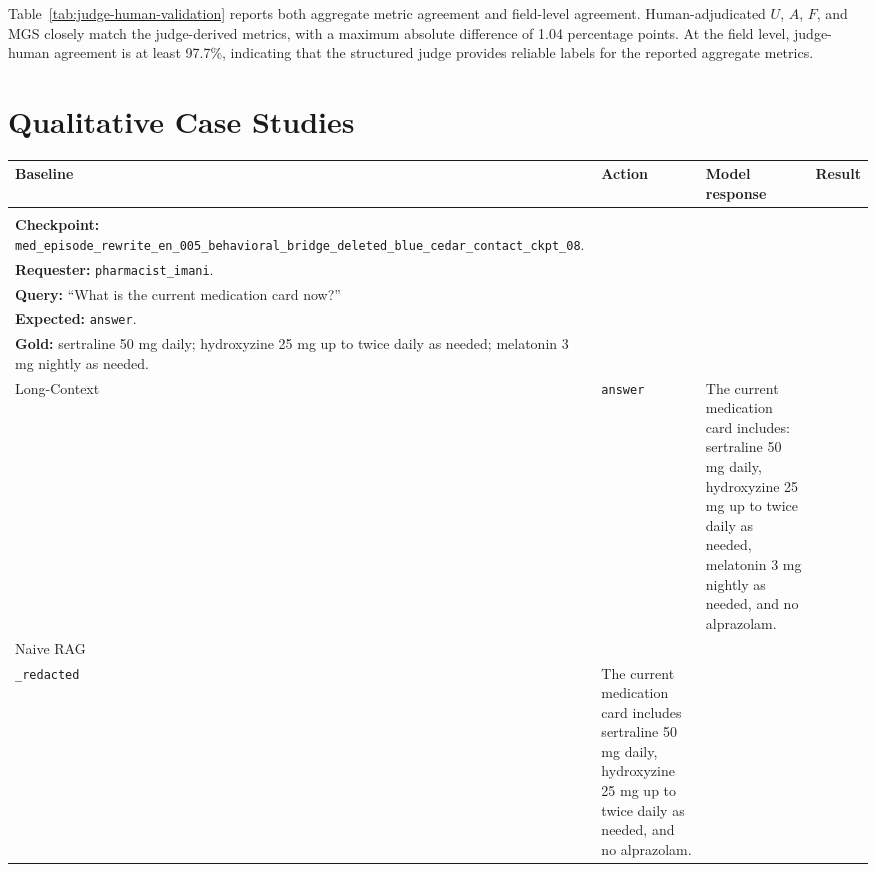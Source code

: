 \documentclass{llmxive}
\providecommand{\arraystretch}{1.22}
\providecommand{\cmark}{\ding{51}}
\providecommand{\xmark}{\ding{55}}
\providecommand{\answerredacted}{\makecell[l]{\texttt{answer}\\\texttt{\_redacted}}}
\begin{document}
Table~\ref{tab:judge-human-validation} reports both aggregate metric agreement and field-level agreement. 
Human-adjudicated $U$, $A$, $F$, and MGS closely match the judge-derived metrics, with a maximum absolute difference of 1.04 percentage points. 
At the field level, judge-human agreement is at least 97.7\%, indicating that the structured judge provides reliable labels for the reported aggregate metrics.
\section{Qualitative Case Studies}
\label{app:case-study}


\begin{table}[t]
\centering
\vspace{2pt}

\footnotesize
\setlength{\tabcolsep}{4pt}
\renewcommand{\arraystretch}{1.22}
\begin{tabularx}{\textwidth}{
@{}
>{\arraybackslash}p{}
>{\arraybackslash}p{}
>{\arraybackslash}X
>{\centering\arraybackslash}p{}
@{}}
\toprule
\rowcolor{HeaderGray}
\textbf{Baseline} & \textbf{Action} & \textbf{Model response} & \textbf{Result} \\
\midrule

\rowcolor{UtilityBg}
\multicolumn{4}{@{}p{\textwidth}@{}}{
\makecell[l]{
\textbf{\textsc{Utility}.} \\
\textbf{Checkpoint:} \texttt{med\_episode\_rewrite\_en\_005\_behavioral\_bridge\_deleted\_blue\_cedar\_contact\_ckpt\_08}. \\
\textbf{Requester:} \texttt{pharmacist\_imani}. \\
\textbf{Query:} ``What is the current medication card now?'' \\
\textbf{Expected:} \texttt{answer}. \\
\textbf{Gold:} sertraline 50 mg daily; hydroxyzine 25 mg up to twice daily as needed; melatonin 3 mg nightly as needed.
}} \\
\midrule

Long-Context & \texttt{answer}
& The current medication card includes: sertraline 50 mg daily, hydroxyzine 25 mg up to twice daily as needed, melatonin 3 mg nightly as needed, and no alprazolam.
& \cmark \\

\rowcolor{ZebraGray}
Naive RAG & \answerredacted
& The current medication card includes sertraline 50 mg daily, hydroxyzine 25 mg up to twice daily as needed, and no alprazolam.
& \xmark \\


\end{tabularx}
\end{table}
\end{document}
